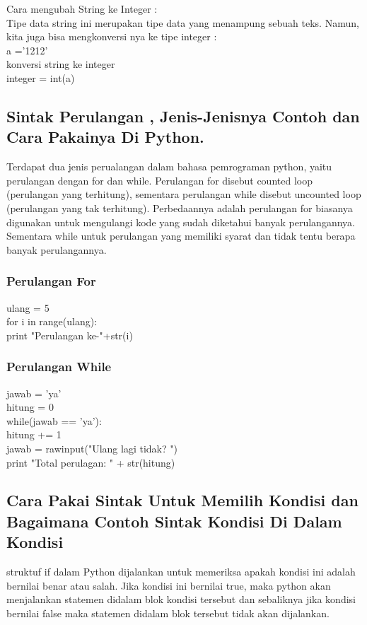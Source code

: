 Cara mengubah String ke Integer :\\
Tipe data string ini merupakan tipe data yang menampung sebuah teks. Namun, kita juga bisa mengkonversi nya ke tipe integer :\\
a ='1212'\\
konversi string ke integer\\
integer = int(a) \\
\subsection{Sintak Perulangan , Jenis-Jenisnya Contoh dan Cara Pakainya Di Python.}
Terdapat dua jenis perualangan dalam bahasa pemrograman python, yaitu perulangan dengan for dan while. Perulangan for disebut counted loop (perulangan yang terhitung), sementara perulangan while disebut uncounted loop (perulangan yang tak terhitung). Perbedaannya adalah perulangan for biasanya digunakan untuk mengulangi kode yang sudah diketahui banyak perulangannya. Sementara while untuk perulangan yang memiliki syarat dan tidak tentu berapa banyak perulangannya.\\
\subsubsection{Perulangan For}
ulang = 5\\
for i in range(ulang):\\
	print "Perulangan ke-"+str(i)
\subsubsection{Perulangan While}

jawab = 'ya'\\
hitung = 0\\

while(jawab == 'ya'):\\
    hitung += 1\\
    jawab = rawinput("Ulang lagi tidak? ")\\    
print "Total perulagan: " + str(hitung)
\subsection{Cara Pakai Sintak Untuk Memilih Kondisi dan Bagaimana Contoh Sintak Kondisi Di Dalam Kondisi}
struktuf if dalam Python dijalankan untuk memeriksa apakah kondisi ini adalah bernilai benar atau salah. Jika kondisi ini bernilai true, maka python akan menjalankan statemen didalam blok kondisi tersebut dan sebaliknya jika kondisi bernilai false maka statemen didalam blok tersebut tidak akan dijalankan. 
